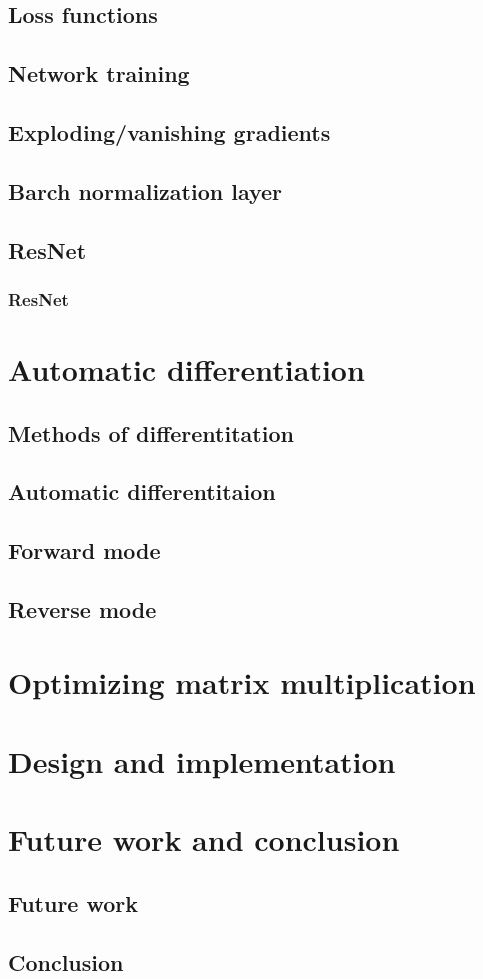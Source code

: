 \documentclass{beamer}
\begin{document}
\subsection{Loss functions}

\subsection{Network training}

\subsection{Exploding/vanishing gradients}

\subsection{Barch normalization layer}

\subsection{ResNet}

\begin{frame}
    \frametitle{ResNet}
\end{frame}

\section{Automatic differentiation}

\subsection{Methods of differentitation}

\subsection{Automatic differentitaion}

\subsection{Forward mode}

\subsection{Reverse mode}

\section{Optimizing matrix multiplication}

\section{Design and implementation}

\section{Future work and conclusion}

\subsection{Future work}

\subsection{Conclusion}
\end{document}
